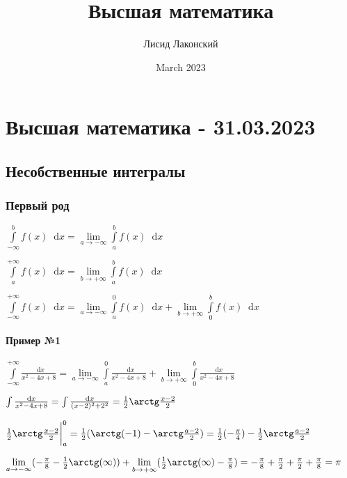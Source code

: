\documentclass{article}
\title{Высшая математика}
\author{Лисид Лаконский}
\date{March 2023}
\newcommand*\diff{\mathop{}\!\mathrm{d}}
\begin{document}
\raggedright

\maketitle

\tableofcontents
\pagebreak

\section{Высшая математика - 31.03.2023}

\subsection{Несобственные интегралы}

\subsubsection{Первый род}

$\int\limits_{-\infty}^{b} f(x) \diff x = \lim\limits_{a \to -\infty} \int\limits_{a}^{b} f(x) \diff x$

$\int\limits_{a}^{+\infty} f(x) \diff x = \lim\limits_{b \to +\infty} \int\limits_{a}^{b} f(x) \diff x$

$\int\limits_{-\infty}^{+\infty} f(x) \diff x = \lim\limits_{a \to -\infty} \int\limits_{a}^{0} f(x) \diff x + \lim\limits_{b \to +\infty} \int\limits_{0}^{b} f(x) \diff x$

\paragraph{Пример №1}

$\int\limits_{-\infty}^{+\infty} \frac{\diff x}{x^2 - 4x + 8} = \lim\limits_{a \to -\infty} \int\limits_{a}^{0} \frac{\diff x}{x^2 - 4x + 8} + \lim\limits_{b \to +\infty} \int\limits_{0}^{b} \frac{\diff x}{x^2 - 4x + 8}$

$\int \frac{\diff x}{x^2 - 4x + 8} = \int \frac{\diff x}{(x - 2)^2 + 2^2} = \frac{1}{2} \arctg \frac{x - 2}{2}$

$\frac{1}{2} \arctg \frac{x - 2}{2} \bigg|_{a}^{0} = \frac{1}{2} (\arctg (-1) - \arctg \frac{a - 2}{2}) = \frac{1}{2} (-\frac{\pi}{4}) - \frac{1}{2} \arctg \frac{a - 2}{2}$

$\lim\limits_{a \to -\infty} (-\frac{\pi}{8} - \frac{1}{2} \arctg (\infty)) + \lim\limits_{b \to +\infty} (\frac{1}{2} \arctg (\infty) - \frac{\pi}{8}) = -\frac{\pi}{8} + \frac{\pi}{2} + \frac{\pi}{2} + \frac{\pi}{8} = \pi$
\end{document}
